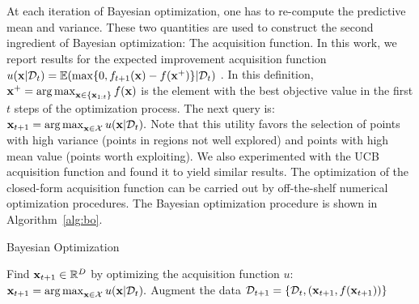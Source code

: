 \documentclass{article}
\DeclareMathOperator*{\argmax}{arg\,max}
\newcommand{\xbest}{\mathbf{\vx}^{+}}
\begin{document}
At each iteration of Bayesian optimization, one has to re-compute the predictive mean and variance. These two quantities are used to construct the second ingredient of Bayesian optimization: The acquisition function. In this work, we report results for the expected improvement acquisition function $u(\vx|\mathcal{D}_t)=\mathbb{E}(\max\{0,f_{t+1}(\vx) - f(\xbest)\} |\data_t)$
\cite{Mockus:1982,Bull:2011}. In this definition, $\xbest = \argmax_{\vx \in \{\vx_{1:t} \} }f(\vx)$
is the element with the best objective value in the first $t$ steps of the optimization process. The next query is:
$\vx_{t+1} = \argmax_{\vx \in {\cal X}} u(\vx|\mathcal{D}_t).$ 
Note that this utility favors the selection of points with high variance (points in regions not well explored) and points with high mean value (points worth exploiting). We also experimented with the UCB acquisition function \cite{Srinivas:2010,deFreitas:2012} and found it to yield similar results. The optimization of the closed-form acquisition function can be carried out by off-the-shelf numerical optimization procedures.
The Bayesian optimization procedure is shown in Algorithm~\ref{alg:bo}. 
\begin{algorithm}
\caption{Bayesian Optimization}
\label{alg:bo}
\begin{algorithmic}[1]
{
  \STATE Find $\mathbf{x}_{t+1} \in \mathbb{R}^D$ by optimizing the acquisition function $u$: $\vx_{t+1} = \argmax_{\vx \in {\cal X}} u(\vx|\mathcal{D}_t).$ 
  \STATE Augment the data $\mathcal{D}_{t+1} = \{\mathcal{D}_{t}, (\mathbf{x}_{t+1}, f(\mathbf{x}_{t+1})) \}$
\ENDFOR
}
\end{algorithmic}
\end{algorithm}
\end{document}
